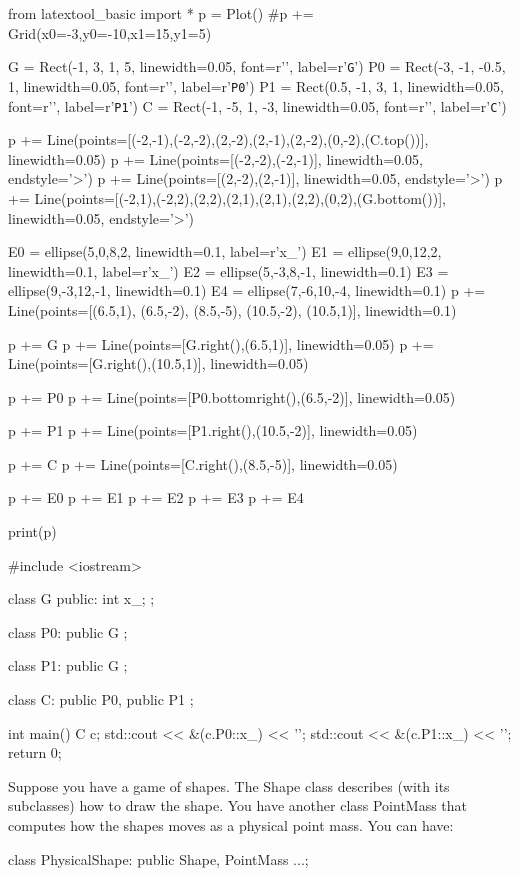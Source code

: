 \begin{python}
from latextool_basic import *
p = Plot()
#p += Grid(x0=-3,y0=-10,x1=15,y1=5)

G = Rect(-1, 3, 1, 5, linewidth=0.05, font=r'\huge', label=r'\texttt{G}')
P0 = Rect(-3, -1, -0.5, 1, linewidth=0.05, font=r'\huge', label=r'\texttt{P0}')
P1 = Rect(0.5, -1, 3, 1, linewidth=0.05, font=r'\huge', label=r'\texttt{P1}')
C = Rect(-1, -5, 1, -3, linewidth=0.05, font=r'\huge', label=r'\texttt{C}')

p += Line(points=[(-2,-1),(-2,-2),(2,-2),(2,-1),(2,-2),(0,-2),(C.top())], linewidth=0.05)
p += Line(points=[(-2,-2),(-2,-1)], linewidth=0.05, endstyle='>')
p += Line(points=[(2,-2),(2,-1)], linewidth=0.05, endstyle='>')
p += Line(points=[(-2,1),(-2,2),(2,2),(2,1),(2,1),(2,2),(0,2),(G.bottom())], linewidth=0.05, endstyle='>')

E0 = ellipse(5,0,8,2, linewidth=0.1, label=r'x\_')
E1 = ellipse(9,0,12,2, linewidth=0.1, label=r'x\_')
E2 = ellipse(5,-3,8,-1, linewidth=0.1)
E3 = ellipse(9,-3,12,-1, linewidth=0.1)
E4 = ellipse(7,-6,10,-4, linewidth=0.1)
p += Line(points=[(6.5,1), (6.5,-2), (8.5,-5), (10.5,-2), (10.5,1)], linewidth=0.1)

p += G
p += Line(points=[G.right(),(6.5,1)], linewidth=0.05)
p += Line(points=[G.right(),(10.5,1)], linewidth=0.05)

p += P0
p += Line(points=[P0.bottomright(),(6.5,-2)], linewidth=0.05)

p += P1
p += Line(points=[P1.right(),(10.5,-2)], linewidth=0.05)

p += C
p += Line(points=[C.right(),(8.5,-5)], linewidth=0.05)


p += E0
p += E1
p += E2
p += E3
p += E4

print(p)
\end{python}

\begin{console}
#include <iostream>

class G
{
public:
        int x_;
};

class P0: public G
{};

class P1: public G
{};

class C: public P0, public P1
{};

int main()
{   
    C c;
    std::cout << &(c.P0::x_) << '\n';
    std::cout << &(c.P1::x_) << '\n';
    return 0;
}
\end{console}

Suppose you have a game of shapes. The Shape class describes (with its
subclasses) how to draw the shape. You have another class PointMass that
computes how the shapes moves as a physical point mass. You can have:
\begin{console}
class PhysicalShape: public Shape, PointMass
{...};
\end{console}

